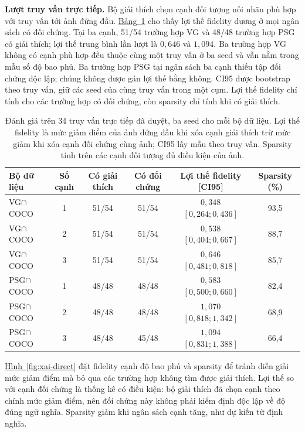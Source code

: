 \textbf{Lượt truy vấn trực tiếp.} Bộ giải thích chọn cạnh đối tượng nối nhãn phù hợp với truy vấn tới ảnh đứng đầu. \hyperref[tab:xai-direct]{Bảng~\ref*{tab:xai-direct}} cho thấy lợi thế fidelity dương ở mọi ngân sách có đối chứng. Tại ba cạnh, 51/54 trường hợp VG và 48/48 trường hợp PSG có giải thích; lợi thế trung bình lần lượt là $0{,}646$ và $1{,}094$. Ba trường hợp VG không có cạnh phù hợp đều thuộc cùng một truy vấn ở ba seed và vẫn nằm trong mẫu số độ bao phủ. Ba trường hợp PSG tại ngân sách ba cạnh thiếu tập đối chứng độc lập; chúng không được gán lợi thế bằng không. CI95 được bootstrap theo truy vấn, giữ các seed của cùng truy vấn trong một cụm. Lợi thế fidelity chỉ tính cho các trường hợp có đối chứng, còn sparsity chỉ tính khi có giải thích.

\begin{table}[t]
\caption{Đánh giá trên 34 truy vấn trực tiếp đã duyệt, ba seed cho mỗi bộ dữ liệu. Lợi thế fidelity là mức giảm điểm của ảnh đứng đầu khi xóa cạnh giải thích trừ mức giảm khi xóa cạnh đối chứng cùng ảnh; CI95 lấy mẫu theo truy vấn. Sparsity tính trên các cạnh đối tượng đủ điều kiện của ảnh.}\label{tab:xai-direct}
\centering\small
\begin{tabular}{lccccc}
\toprule
Bộ dữ liệu & Số cạnh & Có giải thích & Có đối chứng & Lợi thế fidelity [CI95] & Sparsity (\%)\\\midrule
VG$\cap$COCO & 1 & 51/54 & 51/54 & $0{,}348$ $[0{,}264;0{,}436]$ & 93,5\\
VG$\cap$COCO & 2 & 51/54 & 51/54 & $0{,}538$ $[0{,}404;0{,}667]$ & 88,7\\
VG$\cap$COCO & 3 & 51/54 & 51/54 & $0{,}646$ $[0{,}481;0{,}818]$ & 85,7\\
PSG$\cap$COCO & 1 & 48/48 & 48/48 & $0{,}583$ $[0{,}500;0{,}660]$ & 82,4\\
PSG$\cap$COCO & 2 & 48/48 & 48/48 & $1{,}070$ $[0{,}818;1{,}342]$ & 68,9\\
PSG$\cap$COCO & 3 & 48/48 & 45/48 & $1{,}094$ $[0{,}831;1{,}388]$ & 66,4\\\bottomrule
\end{tabular}
\end{table}

\hyperref[fig:xai-direct]{Hình~\ref*{fig:xai-direct}} đặt fidelity cạnh độ bao phủ và sparsity để tránh diễn giải mức giảm điểm mà bỏ qua các trường hợp không tìm được giải thích. Lợi thế so với cạnh đối chứng là thống kê có điều kiện: bộ giải thích đã chọn cạnh theo chính mức giảm điểm, nên đối chứng này không phải kiểm định độc lập về độ đúng ngữ nghĩa. Sparsity giảm khi ngân sách cạnh tăng, như dự kiến từ định nghĩa.


